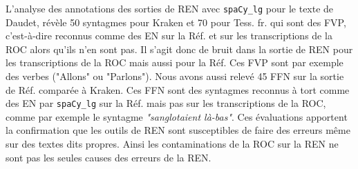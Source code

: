 %     


L'analyse des annotations des sorties de REN avec \texttt{spaCy\_lg} pour le texte de Daudet, révèle 50 syntagmes pour Kraken et 70 pour Tess. fr. qui sont des FVP, c'est-à-dire reconnus comme des EN sur la Réf. et sur les transcriptions de la ROC alors qu'ils n'en sont pas. Il s'agit donc de bruit dans la sortie de REN pour les transcriptions de la ROC mais aussi pour la Réf. Ces FVP sont par exemple des verbes ("Allons" ou "Parlons"). Nous avons aussi relevé 45 FFN sur la sortie de Réf. comparée à Kraken. Ces FFN sont des syntagmes reconnus à tort comme des EN par \texttt{spaCy\_lg} sur la Réf. mais pas sur les transcriptions de la ROC, comme par exemple le syntagme \textit{"sanglotaient là-bas"}. Ces évaluations apportent la confirmation que les outils de REN sont susceptibles de faire des erreurs même sur des textes dits \og{}propres\fg{}. Ainsi les contaminations de la ROC sur la REN ne sont pas les seules causes des erreurs de la REN. 




%    
%


